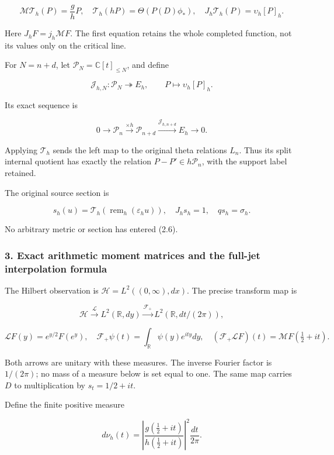 \[\mathcal M\mathcal T_h(P)=\frac gh P,\quad
\mathcal T_h(hP)=\Theta(P(D)\phi_*),\quad
J_h\mathcal T_h(P)=\upsilon_h[P]_h.\tag{2.5}\]

Here \(J_hF=j_h\mathcal MF\). The first equation retains the whole
completed function, not its values only on the critical line.

For \(N=n+d\), let \(\mathcal P_N=\mathbb C[t]_{\le N}\), and define

\[\mathcal J_{h,N}:\mathcal P_N\twoheadrightarrow E_h,\qquad P\longmapsto\upsilon_h[P]_h.\]

Its exact sequence is

\[\boxed{0\longrightarrow\mathcal P_n\xrightarrow{\times h}\mathcal P_{n+d}
\xrightarrow{\mathcal J_{h,n+d}}E_h\longrightarrow0.}\tag{2.6}\]

Applying \(\mathcal T_h\) sends the left map to the original theta
relations \(L_n\). Thus its split internal quotient has exactly the
relation \(P-P'\in h\mathcal P_n\), with the support label retained.

The original source section is

\[s_h(u)=\mathcal T_h(\operatorname{rem}_h(\varepsilon_hu)),\quad J_hs_h=1,\quad qs_h=\sigma_h.\tag{2.7}\]

No arbitrary metric or section has entered (2.6).

\subsubsection{3. Exact arithmetic moment matrices and the full-jet
interpolation
formula}\label{pr_14:exact-arithmetic-moment-matrices-and-the-full-jet-interpolation-formula}

The Hilbert observation is \(\mathcal H=L^2((0,\infty),dx)\). The
precise transform map is

\[\mathcal H\xrightarrow{\mathcal L}L^2(\mathbb R,dy)
\xrightarrow{\mathcal F_+}L^2(\mathbb R,dt/(2\pi)),\]

\[\mathcal LF(y)=e^{y/2}F(e^y),\quad
\mathcal F_+\psi(t)=\int_{\mathbb R}\psi(y)e^{ity}dy,\quad
(\mathcal F_+\mathcal LF)(t)=\mathcal MF(\tfrac12+it).\tag{3.1}\]

Both arrows are unitary with these measures. The inverse Fourier factor
is \(1/(2\pi)\); no mass of a measure below is set equal to one. The
same map carries \(D\) to multiplication by \(s_t=1/2+it\).

Define the finite positive measure

\[\boxed{d\nu_h(t)=\left|\frac{g(\tfrac12+it)}{h(\tfrac12+it)}\right|^2\frac{dt}{2\pi}.}\tag{3.2}\]

